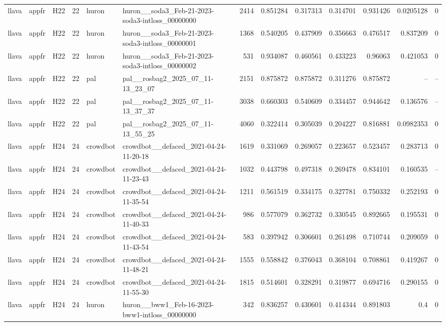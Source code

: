 \begin{longtable}{lllrllrrrrrrr}
llava & appfr & H22 & 22 & huron & huron\_\_soda3\_Feb-21-2023-soda3-intloss\_00000000 & 2414 & 0.851284 & 0.317313 & 0.314701 & 0.931426 & 0.0205128 & 0 \\
llava & appfr & H22 & 22 & huron & huron\_\_soda3\_Feb-21-2023-soda3-intloss\_00000001 & 1368 & 0.540205 & 0.437909 & 0.356663 & 0.476517 & 0.837209 & 0 \\
llava & appfr & H22 & 22 & huron & huron\_\_soda3\_Feb-21-2023-soda3-intloss\_00000002 & 531 & 0.934087 & 0.460561 & 0.433223 & 0.96063 & 0.421053 & 0 \\
llava & appfr & H22 & 22 & pal & pal\_\_rosbag2\_2025\_07\_11-13\_23\_07 & 2151 & 0.875872 & 0.875872 & 0.311276 & 0.875872 & -- & -- \\
llava & appfr & H22 & 22 & pal & pal\_\_rosbag2\_2025\_07\_11-13\_37\_37 & 3038 & 0.660303 & 0.540609 & 0.334457 & 0.944642 & 0.136576 & -- \\
llava & appfr & H22 & 22 & pal & pal\_\_rosbag2\_2025\_07\_11-13\_55\_25 & 4060 & 0.322414 & 0.305039 & 0.204227 & 0.816881 & 0.0982353 & 0 \\
llava & appfr & H24 & 24 & crowdbot & crowdbot\_\_defaced\_2021-04-24-11-20-18 & 1619 & 0.331069 & 0.269057 & 0.223657 & 0.523457 & 0.283713 & 0 \\
llava & appfr & H24 & 24 & crowdbot & crowdbot\_\_defaced\_2021-04-24-11-23-43 & 1032 & 0.443798 & 0.497318 & 0.269478 & 0.834101 & 0.160535 & -- \\
llava & appfr & H24 & 24 & crowdbot & crowdbot\_\_defaced\_2021-04-24-11-35-54 & 1211 & 0.561519 & 0.334175 & 0.327781 & 0.750332 & 0.252193 & 0 \\
llava & appfr & H24 & 24 & crowdbot & crowdbot\_\_defaced\_2021-04-24-11-40-33 & 986 & 0.577079 & 0.362732 & 0.330545 & 0.892665 & 0.195531 & 0 \\
llava & appfr & H24 & 24 & crowdbot & crowdbot\_\_defaced\_2021-04-24-11-43-54 & 583 & 0.397942 & 0.306601 & 0.261498 & 0.710744 & 0.209059 & 0 \\
llava & appfr & H24 & 24 & crowdbot & crowdbot\_\_defaced\_2021-04-24-11-48-21 & 1555 & 0.558842 & 0.376043 & 0.368104 & 0.708861 & 0.419267 & 0 \\
llava & appfr & H24 & 24 & crowdbot & crowdbot\_\_defaced\_2021-04-24-11-55-30 & 1815 & 0.514601 & 0.328291 & 0.319877 & 0.694716 & 0.290155 & 0 \\
llava & appfr & H24 & 24 & huron & huron\_\_bww1\_Feb-16-2023-bww1-intloss\_00000000 & 342 & 0.836257 & 0.430601 & 0.414344 & 0.891803 & 0.4 & 0 \\

\end{longtable}
